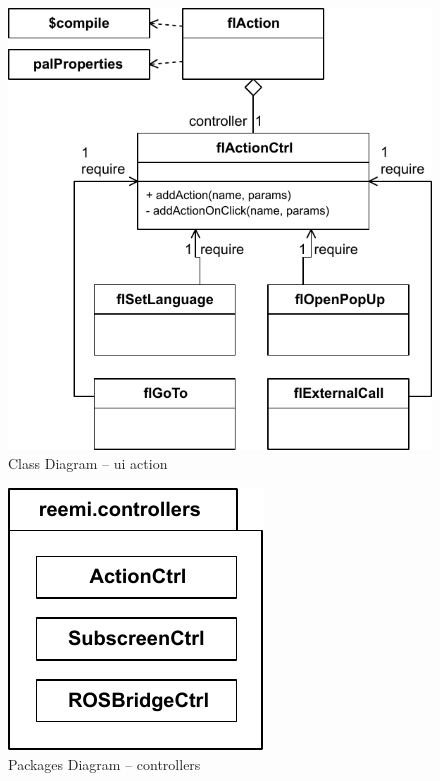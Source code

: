 \begin{figure}[htb]
    \centering
    \includegraphics{figures/design-class-action.pdf}
    \caption{Class Diagram -- ui action}
    \label{fig:class-action}
\end{figure}


\FloatBarrier
\begin{figure}[htb]
    \centering
    \includegraphics{figures/design-package-controllers.pdf}
    \caption{Packages Diagram -- controllers}
    \label{fig:pkg-controllers}
\end{figure}

